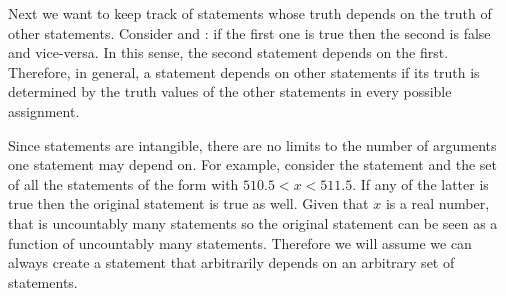 \documentclass[11pt,letterpaper,fleqn]{memoir} %
\begin{document}
Next we want to keep track of statements whose truth depends on the truth of other statements. Consider  and : if the first one is true then the second is false and vice-versa. In this sense, the second statement depends on the first. Therefore, in general, a statement depends on other statements if its truth is determined by the truth values of the other statements in every possible assignment.

Since statements are intangible, there are no limits to the number of arguments one statement may depend on. For example, consider the statement  and the set of all the statements of the form  with $510.5 < x < 511.5$. If any of the latter is true then the original statement is true as well. Given that $x$ is a real number, that is uncountably many statements so the original statement can be seen as a function of uncountably many statements. Therefore we will assume we can always create a statement that arbitrarily depends on an arbitrary set of statements.
\end{document}
